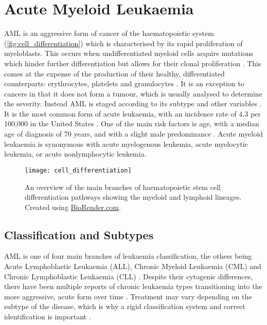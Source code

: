 \section{Acute Myeloid Leukaemia}


\ac{AML} is an aggressive form of cancer of the haematopoietic system (\autoref{fig:cell_differentiation}) which is characterised by its rapid proliferation of myeloblasts. This occurs when undifferentiated myeloid cells acquire mutations which hinder further differentiation but allows for their clonal proliferation \citep{Khwaja2016}. This comes at the expense of the production of their healthy, differentiated counterparts: erythrocytes, platelets and granulocytes \citep{Khwaja2016}. It is an exception to cancers in that it does not form a tumour, which is usually analysed to determine the severity. Instead \ac{AML} is staged according to its subtype and other variables \citep{ACS2018}. It is the most common form of acute leukaemia, with an incidence rate of 4.3 per 100,000 in the United States \citep{Kouchkovsky2016}. One of the main risk factors is age, with a median age of diagnosis of 70 years, and with a slight male predominance \citep{juliusson2009age, Khwaja2016}. Acute myeloid leukaemia is synonymous with acute myelogenous leukemia, acute myelocytic leukemia, or acute nonlymphocytic leukemia.


\begin{figure}[!h]
    \centering
    \texttt{[image: cell\_differentiation]}
    \caption[Stem cell differentiation]{An overview of the main branches of haematopoietic stem cell differentiation pathways showing the myeloid and lymphoid lineages. Created using \href{https://biorender.com/}{BioRender.com}. } 
    \label{fig:cell_differentiation}
\end{figure}

\subsection{Classification and Subtypes}
\label{Classification and Subtypes}
\ac{AML} is one of four main branches of leukaemia classification, the others being Acute Lymphoblastic Leukaemia (ALL), Chronic Myeloid Leukaemia (CML) and Chronic Lymphoblastic Leukaemia (CLL) \citep{leukaemiabook}. Despite their cytogenic differences, there have been multiple reports of chronic leukaemia types transitioning into the more aggressive, acute form over time \citep{kaur2016rapid, frenkel1981acute, jacobs1984acute}. Treatment may vary depending on the subtype of the disease, which is why a rigid classification system and correct identification is important \citep{leukaemiabook}.

